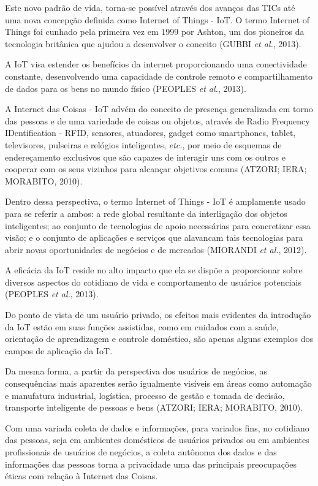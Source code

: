 Este novo padrão de vida, torna-se possível através dos avanços das TICs até uma nova concepção definida como Internet of Things - IoT. O termo Internet of Things foi cunhado pela primeira vez em 1999 por Ashton, um dos pioneiros da tecnologia britânica que ajudou a desenvolver o conceito (GUBBI \textit{et al.}, 2013).

A IoT visa estender os benefícios da internet proporcionando uma conectividade constante, desenvolvendo uma capacidade de controle remoto e compartilhamento de dados para os bens no mundo físico (PEOPLES \textit{et al.}, 2013).

A Internet das Coisas - IoT advém do conceito de presença generalizada em torno das pessoas e de uma variedade de coisas ou objetos, através de Radio Frequency IDentification - RFID, sensores, atuadores, gadget como smartphones, tablet, televisores, pulseiras e relógios inteligentes, \textit{etc.}, por meio de esquemas de endereçamento exclusivos que são capazes de interagir uns com os outros e cooperar com os seus vizinhos para alcançar objetivos comuns (ATZORI; IERA; MORABITO, 2010).

Dentro dessa perspectiva, o termo Internet of Things - IoT é amplamente usado para se referir a ambos: a rede global resultante da interligação dos objetos inteligentes; ao conjunto de tecnologias de apoio necessárias para concretizar essa visão; e o conjunto de aplicações e serviços que alavancam tais tecnologias para abrir novas oportunidades de negócios e de mercados (MIORANDI \textit{et al.}, 2012).

A eficácia da IoT reside no alto impacto que ela se dispõe a proporcionar sobre diversos aspectos do cotidiano de vida e comportamento de usuários potenciais (PEOPLES \textit{et al.}, 2013).

Do ponto de vista de um usuário privado, os efeitos mais evidentes da introdução da IoT estão em suas funções assistidas, como em cuidados com a saúde, orientação de aprendizagem e controle doméstico, são apenas alguns exemplos dos campos de aplicação da IoT.

Da mesma forma, a partir da perspectiva dos usuários de negócios, as consequências mais aparentes serão igualmente visíveis em áreas como automação e manufatura industrial, logística, processo de gestão e tomada de decisão, transporte inteligente de pessoas e bens (ATZORI; IERA; MORABITO, 2010).

Com uma variada coleta de dados e informações, para variados fins, no cotidiano das pessoas, seja em ambientes domésticos de usuários privados ou em ambientes profissionais de usuários de negócios, a coleta autônoma dos dados e das informações das pessoas torna a privacidade uma das principais preocupações éticas com relação à Internet das Coisas.

